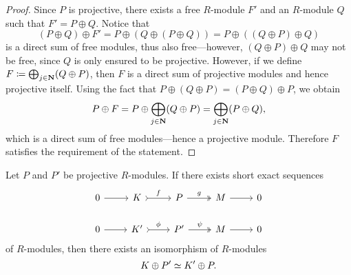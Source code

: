 \begin{proof}
Since \(P\) is projective, there exists a free \(R\)-module \(F'\) and an
\(R\)-module \(Q\) such that \(F' = P \oplus Q\). Notice that
\[
(P \oplus Q) \oplus F'
= P \oplus (Q \oplus (P \oplus Q))
= P \oplus ((Q \oplus P) \oplus Q)
\]
is a direct sum of free modules, thus also free---however, \((Q \oplus P) \oplus
Q\) may not be free, since \(Q\) is only ensured to be projective. However, if
we define \(F \coloneq \bigoplus_{j \in \mathbf{N}} (Q \oplus P)\), then \(F\) is a
direct sum of projective modules and hence projective itself. Using the
fact that \(P \oplus (Q \oplus P) = (P \oplus Q) \oplus P\), we obtain
\[
P \oplus F
= P \oplus \bigoplus_{j \in \mathbf{N}} (Q \oplus P)
= \bigoplus_{j \in \mathbf{N}} (P \oplus Q),
\]
which is a direct sum of free modules---hence a projective module. Therefore
\(F\) satisfies the requirement of the statement.
\end{proof}

\begin{proposition}[Schanuel]
\label{prop:schanuel-lemma}
Let \(P\) and \(P'\) be projective \(R\)-modules. If there exists short exact
sequences
\[
\begin{tikzcd}
0 \ar[r] &K \ar[r, tail, "f"] &P \ar[r, two heads, "g"] &M \ar[r] &0
\\
0 \ar[r] &K' \ar[r, tail, "\phi"] &P' \ar[r, two heads, "\psi"] &M \ar[r] &0
\end{tikzcd}
\]
of \(R\)-modules, then there exists an isomorphism of \(R\)-modules
\[
K \oplus P' \simeq K' \oplus P.
\]
\end{proposition}

